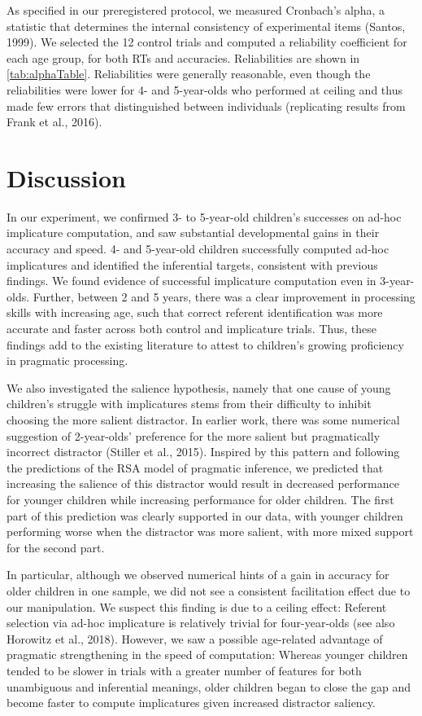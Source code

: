\documentclass[mask,man]{apa6}
\begin{document}
As specified in our preregistered protocol, we measured Cronbach's
alpha, a statistic that determines the internal consistency of
experimental items (Santos, 1999). We selected the 12 control trials and
computed a reliability coefficient for each age group, for both RTs and
accuracies. Reliabilities are shown in \ref{tab:alphaTable}.
Reliabilities were generally reasonable, even though the reliabilities
were lower for 4- and 5-year-olds who performed at ceiling and thus made
few errors that distinguished between individuals (replicating results
from Frank et al., 2016).

\section{Discussion}\label{discussion}

In our experiment, we confirmed 3- to 5-year-old children's successes on
ad-hoc implicature computation, and saw substantial developmental gains
in their accuracy and speed. 4- and 5-year-old children successfully
computed ad-hoc implicatures and identified the inferential targets,
consistent with previous findings. We found evidence of successful
implicature computation even in 3-year-olds. Further, between 2 and 5
years, there was a clear improvement in processing skills with
increasing age, such that correct referent identification was more
accurate and faster across both control and implicature trials. Thus,
these findings add to the existing literature to attest to children's
growing proficiency in pragmatic processing.

We also investigated the salience hypothesis, namely that one cause of
young children's struggle with implicatures stems from their difficulty
to inhibit choosing the more salient distractor. In earlier work, there
was some numerical suggestion of 2-year-olds' preference for the more
salient but pragmatically incorrect distractor (Stiller et al., 2015).
Inspired by this pattern and following the predictions of the RSA model
of pragmatic inference, we predicted that increasing the salience of
this distractor would result in decreased performance for younger
children while increasing performance for older children. The first part
of this prediction was clearly supported in our data, with younger
children performing worse when the distractor was more salient, with
more mixed support for the second part.

In particular, although we observed numerical hints of a gain in
accuracy for older children in one sample, we did not see a consistent
facilitation effect due to our manipulation. We suspect this finding is
due to a ceiling effect: Referent selection via ad-hoc implicature is
relatively trivial for four-year-olds (see also Horowitz et al., 2018).
However, we saw a possible age-related advantage of pragmatic
strengthening in the speed of computation: Whereas younger children
tended to be slower in trials with a greater number of features for both
unambiguous and inferential meanings, older children began to close the
gap and become faster to compute implicatures given increased distractor
saliency.
\end{document}
